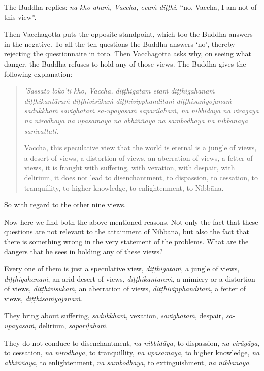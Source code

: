 The Buddha replies: \emph{na kho ahaṁ, Vaccha, evaṁ diṭṭhi}, ``no, Vaccha, I am not of this view''.

Then Vacchagotta puts the opposite standpoint, which too the Buddha answers in the negative. To all the ten questions the Buddha answers `no', thereby rejecting the questionnaire in toto. Then Vacchagotta asks why, on seeing what danger, the Buddha refuses to hold any of those views. The Buddha gives the following explanation:

\begin{quote}
\emph{'Sassato loko'ti kho, Vaccha, diṭṭhigatam etaṁ diṭṭhigahanaṁ diṭṭhikantāraṁ diṭṭhivisūkaṁ diṭṭhivipphanditaṁ diṭṭhisaṁyojanaṁ sadukkhaṁ savighātaṁ sa-upāyāsaṁ sapariḷāhaṁ, na nibbidāya na virāgāya na nirodhāya na upasamāya na abhiññāya na sambodhāya na nibbānāya saṁvattati}.

Vaccha, this speculative view that the world is eternal is a jungle of views, a desert of views, a distortion of views, an aberration of views, a fetter of views, it is fraught with suffering, with vexation, with despair, with delirium, it does not lead to disenchantment, to dispassion, to cessation, to tranquillity, to higher knowledge, to enlightenment, to Nibbāna.
\end{quote}

So with regard to the other nine views.

Now here we find both the above-mentioned reasons. Not only the fact that these questions are not relevant to the attainment of Nibbāna, but also the fact that there is something wrong in the very statement of the problems. What are the dangers that he sees in holding any of these views?

Every one of them is just a speculative view, \emph{diṭṭhigataṁ}, a jungle of views, \emph{diṭṭhigahanaṁ}, an arid desert of views, \emph{diṭṭhikantāraṁ}, a mimicry or a distortion of views, \emph{diṭṭhivisūkaṁ}, an aberration of views, \emph{diṭṭhivipphanditaṁ}, a fetter of views, \emph{diṭṭhisaṁyojanaṁ}.

They bring about suffering, \emph{sadukkhaṁ}, vexation, \emph{savighātaṁ}, despair, \emph{sa-upāyāsaṁ}, delirium, \emph{sapariḷāhaṁ}.

They do not conduce to disenchantment, \emph{na nibbidāya}, to dispassion, \emph{na virāgāya}, to cessation, \emph{na nirodhāya}, to tranquillity, \emph{na upasamāya}, to higher knowledge, \emph{na abhiññāya}, to enlightenment, \emph{na sambodhāya}, to extinguishment, \emph{na nibbānāya}.

